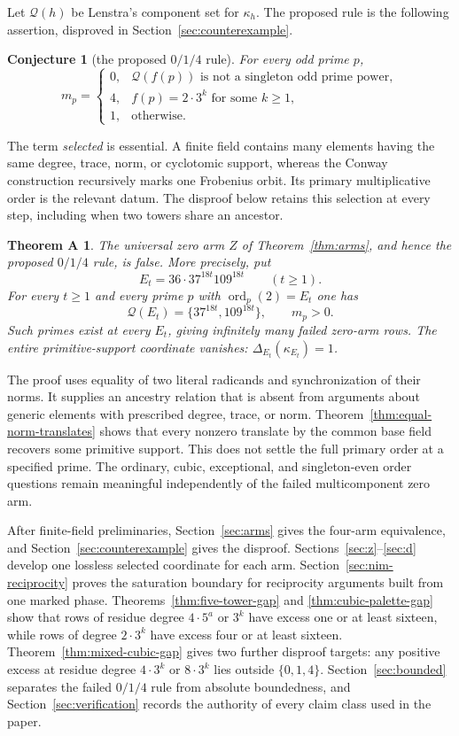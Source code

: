 \documentclass[11pt]{article}
\newtheorem{conjecture}[theorem]{Conjecture}
\newtheorem*{thmA}{Theorem A}
\theoremstyle{definition}
\theoremstyle{remark}
\begin{document}
Let $\mathcal Q(h)$ be Lenstra's component set for $\kappa_h$.  The
proposed rule is the following assertion, disproved in
Section~\ref{sec:counterexample}.

\begin{conjecture}[the proposed $0/1/4$ rule]\label{conj:rule}
For every odd prime $p$,
\[
 m_p=
 \begin{cases}
  0,&\mathcal Q(f(p))\text{ is not a singleton odd prime power},\\
  4,&f(p)=2\cdot3^k\text{ for some }k\geq1,\\
  1,&\text{otherwise}.
 \end{cases}
\]
\end{conjecture}

The term \emph{selected} is essential.  A finite field contains many
elements having the same degree, trace, norm, or cyclotomic support, whereas
the Conway construction recursively marks one Frobenius orbit.  Its primary
multiplicative order is the relevant datum.  The disproof below retains this
selection at every step, including when two towers share an ancestor.

\begin{thmA}
The universal zero arm $Z$ of Theorem~\ref{thm:arms}, and hence the proposed
$0/1/4$ rule, is false.  More precisely, put
\[
 E_t=36\cdot37^{18t}109^{18t}\qquad(t\geq1).
\]
For every $t\geq1$ and every prime $p$ with
$\operatorname{ord}_p(2)=E_t$ one has
\[
 \mathcal Q(E_t)=\{37^{18t},109^{18t}\},\qquad m_p>0.
\]
Such primes exist at every $E_t$, giving infinitely many failed zero-arm
rows.  The entire primitive-support coordinate vanishes:
$\Delta_{E_t}(\kappa_{E_t})=1$.
\end{thmA}

The proof uses equality of two literal radicands and synchronization of their
norms.  It supplies an ancestry relation that is absent from arguments about
generic elements with prescribed degree, trace, or norm.  Theorem~\ref{thm:equal-norm-translates} shows that every nonzero translate
by the common base field recovers some primitive support.  This does not
settle the full primary order at a specified prime.  The ordinary,
cubic, exceptional, and singleton-even order questions remain meaningful
independently of the failed multicomponent zero arm.

After finite-field preliminaries, Section~\ref{sec:arms} gives the four-arm
equivalence, and Section~\ref{sec:counterexample} gives the disproof.
Sections~\ref{sec:z}--\ref{sec:d} develop one lossless selected
coordinate for each arm.  Section~\ref{sec:nim-reciprocity} proves the
saturation boundary for reciprocity arguments built from one marked phase.
Theorems~\ref{thm:five-tower-gap} and \ref{thm:cubic-palette-gap} show that
rows of residue degree $4\cdot5^a$ or $3^k$ have excess one or at least
sixteen, while rows of degree $2\cdot3^k$ have excess four or at least
sixteen.
Theorem~\ref{thm:mixed-cubic-gap} gives two further disproof targets:
any positive excess at residue degree $4\cdot3^k$ or $8\cdot3^k$ lies
outside $\{0,1,4\}$.
Section~\ref{sec:bounded} separates the failed $0/1/4$ rule from absolute
boundedness, and Section~\ref{sec:verification} records the authority of every
claim class used in the paper.
\end{document}
